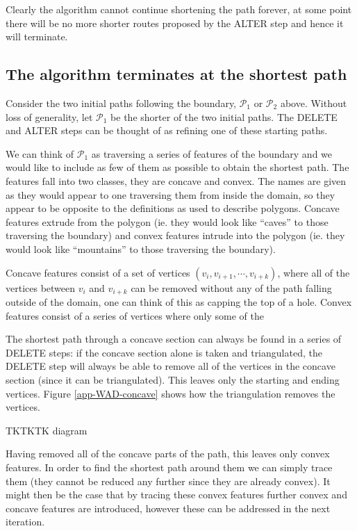 Clearly the algorithm cannot continue shortening the path forever, at some point there will be no more shorter routes proposed by the ALTER step and hence it will terminate.


\subsection{The algorithm terminates at the shortest path}

Consider the two initial paths following the boundary, $\mathcal{P}_1$ or $\mathcal{P}_2$ above. Without loss of generality, let $\mathcal{P}_1$ be the shorter of the two initial paths. The DELETE and ALTER steps can be thought of as refining one of these starting paths.

We can think of $\mathcal{P}_1$ as traversing a series of features of the boundary and we would like to include as few of them as possible to obtain the shortest path. The features fall into two classes, they are concave and convex. The names are given as they would appear to one traversing them from inside the domain, so they appear to be opposite to the definitions as used to describe polygons. Concave features extrude from the polygon (ie. they would look like ``caves'' to those traversing the boundary) and convex features intrude into the polygon (ie. they would look like ``mountains'' to those traversing the boundary).




Concave features consist of a set of vertices $(v_i, v_{i+1},\cdots,v_{i+k})$, where all of the vertices between $v_i$ and $v_{i+k}$ can be removed without any of the path falling outside of the domain, one can think of this as capping the top of a hole. Convex features consist of a series of vertices where  only some of the 


The shortest path through a concave section can always be found in a series of DELETE steps: if the concave section alone is taken and triangulated, the DELETE step will always be able to remove all of the vertices in the concave section (since it can be triangulated). This leaves only the starting and ending vertices. Figure \ref{app-WAD-concave} shows how the triangulation removes the vertices.


TKTKTK diagram

Having removed all of the concave parts of the path, this leaves only convex features. In order to find the shortest path around them we can simply trace them (they cannot be reduced any further since they are already convex). It might then be the case that by tracing these convex features further convex and concave features are introduced, however these can be addressed in the next iteration.

